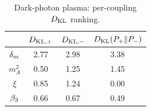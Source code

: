 \begin{table}[h]
  \centering
  \begin{tabular}{c | c c c}
  \toprule
  & $D_\mathrm{KL,+}$ & $D_\mathrm{KL,-}$ & $D_\mathrm{KL}(P_+\|P_-)$ \\
  \midrule
  $\delta_{m}$    & 2.77 & 2.98 & 3.38 \\
  $m_A^{2}$    & 0.50 & 1.25 & 1.45 \\
  $\xi$         & 0.85 & 1.24 & 0.00 \\
  $\beta_{3}$    & 0.66 & 0.67 & 0.49 \\
  \bottomrule
  \end{tabular}
  \caption{Dark-photon plasma: per-coupling $D_\mathrm{KL}$ ranking.}
  \label{KLTableDarkPhoton}
\end{table}

%
%
